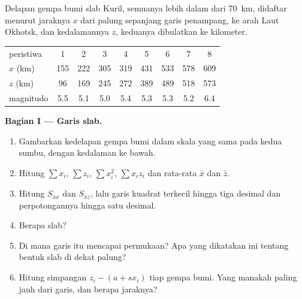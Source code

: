 \begin{problem}
\label{pb:b1:active-margins:1}
Delapan gempa bumi slab Kuril, semuanya lebih dalam dari \qty{70}{km}, didaftar menurut jaraknya $x$ dari palung sepanjang garis penampang, ke arah Laut Okhotsk, dan kedalamannya $z$, keduanya dibulatkan ke kilometer.

\begin{center}
\small
\begin{tabular}{lcccccccc}
\hline
peristiwa & 1 & 2 & 3 & 4 & 5 & 6 & 7 & 8\\
$x$ (\unit{km}) & 155 & 222 & 305 & 319 & 431 & 533 & 578 & 609\\
$z$ (\unit{km}) & 96 & 169 & 245 & 272 & 389 & 489 & 518 & 573\\
magnitudo & 5.5 & 5.1 & 5.0 & 5.4 & 5.3 & 5.3 & 5.2 & 6.4\\
\hline
\end{tabular}
\end{center}

\medskip
\noindent\textbf{Bagian I --- Garis slab.}
\begin{enumerate}
  \item Gambarkan kedelapan gempa bumi dalam skala yang sama pada kedua sumbu, dengan
        kedalaman ke bawah.
  \item Hitung $\sum x_i$, $\sum z_i$, $\sum x_i^2$, $\sum x_i z_i$ dan rata-rata
        $\bar x$ dan $\bar z$.
  \item Hitung $S_{xx}$ dan $S_{xz}$, lalu  garis kuadrat terkecil hingga tiga
        desimal dan perpotongannya hingga satu desimal.
  \item Berapa  slab?
  \item Di mana garis itu mencapai permukaan? Apa yang dikatakan ini tentang bentuk slab
        di dekat palung?
  \item Hitung simpangan $z_i - (a + s x_i)$ tiap gempa bumi. Yang manakah paling jauh dari
        garis, dan berapa jaraknya?
\end{enumerate}


\end{problem}
